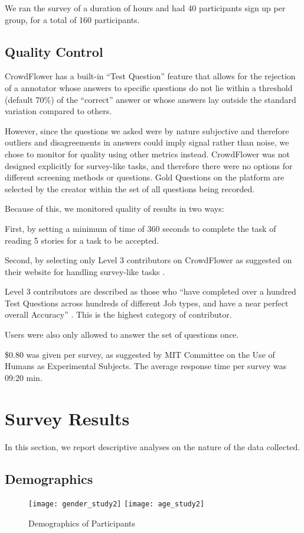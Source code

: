 We ran the survey of a duration of  hours and had 40 participants sign up per group, for a total of 160 participants.

\subsection{Quality Control}

CrowdFlower has a built-in ``Test Question'' feature that allows for the rejection of a annotator whose answers to specific questions do not lie within a threshold (default 70\%) of the ``correct'' answer or whose answers lay outside the standard variation compared to others.

However, since the questions we asked were by nature subjective and therefore outliers and disagreements in answers could imply signal rather than noise, we chose to monitor for quality using other metrics instead. CrowdFlower was not designed explicitly for survey-like tasks, and therefore there were no options for different screening methods or questions. Gold Questions on the platform are selected by the creator within the set of all questions being recorded.

Because of this, we monitored quality of results in two ways:

First, by setting a minimum of time of 360 seconds to complete the task of reading 5 stories for a task to be accepted.

Second, by selecting only Level 3 contributors on CrowdFlower as suggested on their website for handling survey-like tasks \cite{CrowdFlower-guide}.

Level 3 contributors are described as those who ``have completed over a hundred Test Questions across hundreds of different Job types, and have a near perfect overall Accuracy'' \cite{CrowdFlower-levels}. This is the highest category of contributor.
 
Users were also only allowed to answer the set of questions once. 

\$0.80 was given per survey, as suggested by MIT Committee on the Use of Humans as Experimental Subjects. The average response time per survey was 09:20 min.


\section{Survey Results}
In this section, we report descriptive analyses on the nature of the data collected.

\subsection{Demographics}
\begin{figure}[H] 
\centering 
  \texttt{[image: gender\_study2]} 
  \texttt{[image: age\_study2]} 
  \caption{Demographics of Participants
    \label{fig:demographics2}}
\end{figure}


